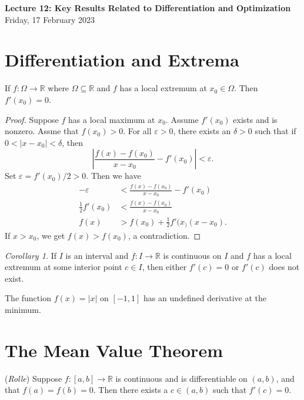 \documentclass[11pt]{article}
\theoremstyle{definition}
\newcommand{\R}{\mathbb{R}}                      %
\begin{document}
\thispagestyle{empty}

\begin{center}
{\LARGE \bf Lecture 12: Key Results Related to Differentiation and Optimization}\\
{\large Friday, 17 February 2023}\\

\end{center}


\section{Differentiation and Extrema}

\prop If $f:\Omega\to \R$ where $\Omega\subseteq \R$ and $f$ has a local extremum at $x_0\in\Omega$. Then $f'(x_0)=0$.

\begin{proof}
    Suppose $f$ has a local maximum at $x_0$. Assume $f'(x_0)$ exists and is nonzero. Assme that $f(x_0)>0$. For all $\varepsilon>0$, there exists an $\delta>0$ such that if $0<|x-x_0|<\delta$, then
    $$
    \left|\frac{f(x)-f(x_0)}{x-x_0}-f'(x_0)\right|<\varepsilon.
    $$
    Set $\varepsilon=f'(x_0)/2>0$. Then we have
    \begin{align*}
        -\varepsilon&<\frac{f(x)-f(x_0)}{x-x_0}-f'(x_0)\\
        \frac{1}{2}f'(x_0)&<\frac{f(x)-f(x_0)}{x-x_0}\\
        f(x)&>f(x_0)+\frac{1}{2}f'(x_)(x-x_0).
    \end{align*}
    If $x>x_0$, we get $f(x)>f(x_0)$, a contradiction.
\end{proof}

\textit{Corollary 1.} If $I$ is an interval and $f:I\to\R$ is continuous on $I$ and $f$ has a local extremum at some interior point $c\in I$, then either $f'(c)=0$ or $f'(c)$ does not exist.

\ex The function $f(x)=|x|$ on $[-1,1]$ has an undefined derivative at the minimum.

\section{The Mean Value Theorem}

\begin{shaded}
\theorem (\textit{Rolle}) Suppose $f:[a,b]\to \R$ is continuous and is differentiable on $(a,b)$, and that $f(a)=f(b)=0$. Then there exists a $c\in(a,b)$ such that $f'(c)=0$.
\end{shaded}
\end{document}
